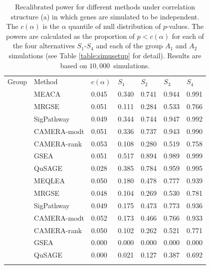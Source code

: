 \documentclass[a4,center,fleqn]{NAR}
\newcommand{\OurMethod}{MEACA}
\newcommand{\aaCase}{a}
\newcommand{\CMR}{CAMERA-rank}
\newcommand{\CMT}{CAMERA-modt}
\newcommand{\gent}{SigPathway}
\newcommand{\genr}{MRGSE}
\newcommand{\HowmanySimu}{$10,000$}
\begin{document}
	\begin{table}[!ht]
		\centering
		\caption[Recalibrated power for different methods]{Recalibrated power for different 
			methods under correlation structure (\aaCase) in which genes are simulated to be 
			independent. The $c(\alpha)$ is the $\alpha$ quantile of null distribution of 
			$p$-values. 
			The powers are calculated as the proportion of $p<c(\alpha)$ for each of the four 
			alternatives $S_1$-$S_4$ and each of the group $A_1$ and $A_2$ simulations (see Table 
			\ref{table:simusetup} for detail). Results are based on \HowmanySimu~simulations.
		}\label{table:power}
	\begin{tabular}{cp{3cm}p{2cm}p{2cm}p{2cm}p{2cm}p{2cm}}
		\toprule
			Group & Method &$c(\alpha)$	& $S_1$ & $S_2$ & $S_3$	&$S_4$  \\ 
		\colrule
			\multirow{7}{*}{$A_1$} & \OurMethod & 0.045 & 0.340 & 0.741 & 0.944 & 0.991 \\ 
			&	\genr  & 0.051 & 0.111 & 0.284 & 0.533 & 0.766 \\ 
			&	\gent & 0.049 & 0.344 & 0.744 & 0.947 & 0.992 \\ 
			&	\CMT  & 0.051 & 0.336 & 0.737 & 0.943 & 0.990 \\ 
			&	\CMR  & 0.053 & 0.108 & 0.280 & 0.519 & 0.758 \\ 
			&	GSEA & 0.051 & 0.517 & 0.894 & 0.989 & 0.999 \\ 
			&	QuSAGE & 0.028 & 0.385 & 0.784 & 0.959 & 0.995 \\ 
		\colrule
			\multirow{7}{*}{$A_2$} &	MEQLEA & 0.050 & 0.180 & 0.478 & 0.777 & 0.939 \\ 
			&		\genr & 0.048 & 0.104 & 0.269 & 0.530 & 0.781 \\ 
			&		\gent & 0.049 & 0.175 & 0.473 & 0.773 & 0.936 \\  
			&		\CMT & 0.052 & 0.173 & 0.466 & 0.766 & 0.933 \\ 
			&		\CMR & 0.050 & 0.102 & 0.262 & 0.521 & 0.771 \\ 
			&		GSEA & 0.000 & 0.000 & 0.000 & 0.000 & 0.000 \\ 
			&		QuSAGE  & 0.000 & 0.021 & 0.127 & 0.387 & 0.692 \\ 
		\botrule
		\end{tabular}
	\end{table}
	
	
	
\end{document}
